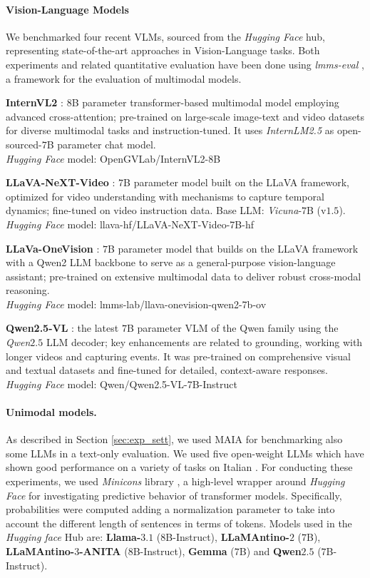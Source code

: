 \paragraph{Vision-Language Models}
We benchmarked four recent VLMs,  sourced from the \textit{Hugging Face} hub, representing state-of-the-art approaches in Vision-Language tasks. Both experiments and related quantitative evaluation have been done using \textit{lmms-eval} \citep{lmmevaluation}, a framework for the evaluation of multimodal models.
\par \textbf{InternVL2} \cite{internvl}: $8$B parameter transformer-based multimodal model employing advanced cross-attention; pre-trained on large-scale image-text and video datasets for diverse multimodal tasks and  instruction-tuned. It uses \textit{InternLM2.5} as open-sourced-$7$B parameter chat model.\\ \textit{Hugging Face} model: OpenGVLab/InternVL2-8B
\par \textbf{LLaVA-NeXT-Video} \cite{llavanextvideo}: $7$B parameter model built on the LLaVA framework, optimized for video understanding with mechanisms to capture temporal dynamics; fine-tuned on video instruction data. Base LLM: \textit{Vicuna}-$7$B (v$1.5$).\\ \textit{Hugging Face} model: llava-hf/LLaVA-NeXT-Video-7B-hf
\par \textbf{LLaVa-OneVision} \cite{llavaonevisioneasyvisualtask}: $7$B parameter model that builds on the LLaVA framework with a Qwen2 LLM backbone to serve as a general-purpose vision-language assistant; pre-trained on extensive multimodal data to deliver robust cross-modal reasoning.\\ \textit{Hugging Face} model: lmms-lab/llava-onevision-qwen2-7b-ov
\par \textbf{Qwen2.5-VL} \cite{qwen2.5technicalreport}: the latest $7$B parameter VLM of the Qwen family using the \textit{Qwen}$2.5$ LLM decoder; key enhancements are related to grounding, working with longer videos and capturing events. It was pre-trained on comprehensive visual and textual datasets and fine-tuned for detailed, context-aware responses.
\\ \textit{Hugging Face} model: Qwen/Qwen2.5-VL-7B-Instruct 
\paragraph{Unimodal models.} As described in Section \ref{sec:exp_sett}, we used MAIA for benchmarking also some LLMs in a text-only evaluation.   We used five open-weight LLMs which have shown good performance on a variety of  tasks on Italian \cite{magnini2025evalitallmbenchmarkinglargelanguage}. For conducting these experiments, we used \textit{Minicons} library \cite{misra2022minicons}, a high-level wrapper around \textit{Hugging Face} for investigating predictive behavior of transformer models. Specifically, probabilities were computed adding a normalization parameter to take into account the different length of sentences in terms of tokens. Models used in the \textit{Hugging face} Hub are: \textbf{Llama-$3.1$} ($8$B-Instruct), \textbf{
LLaMAntino-$2$} ($7$B), \textbf{
LLaMAntino-$3$-ANITA} ($8$B-Instruct), \textbf{
Gemma} ($7$B) and \textbf{Qwen$2.5$} ($7$B-Instruct). 
